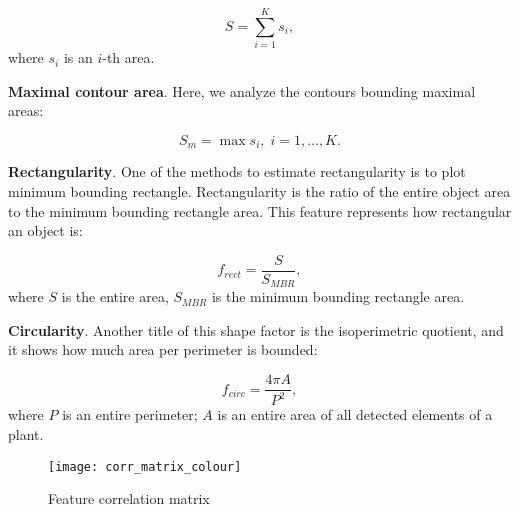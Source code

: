 \begin{equation}
	\label{eq:4}
	 S = \sum_{i=1}^{K}s_i,
\end{equation}
where $s_i$ is an $i$-th area.

\vspace{1cm}

\textbf{Maximal contour area}. Here, we analyze the contours bounding maximal areas:

\begin{equation}
	\label{eq:5}
	 S_m = \max{s_i}, \; i = 1, \dots, K.
\end{equation}


\vspace{1cm}

\textbf{Rectangularity}. One of the methods to estimate rectangularity is to plot minimum bounding rectangle. Rectangularity is the ratio of the entire object area to the minimum bounding rectangle area. This feature represents how rectangular an object is:

\begin{equation}
	f_{rect} = \frac{S}{S_{MBR}},
	\label{eq:6}
\end{equation}
where $S$ is the entire area, $S_{MBR}$ is the minimum bounding rectangle area.

\vspace{1cm}

\textbf{Circularity}. Another title of this shape factor is the isoperimetric quotient, and it shows how much area per perimeter is bounded:

\begin{equation}
	f_{circ} = \frac{4 \pi A}{P^2},
	\label{eq:7}
\end{equation}
where $P$ is an entire perimeter; $A$ is an entire area of all detected elements of a plant.


\begin{figure}[h]
	\centering
	\texttt{[image: corr\_matrix\_colour]}
	\caption{Feature correlation matrix}
	\label{fig_corr_matrix}
\end{figure}


